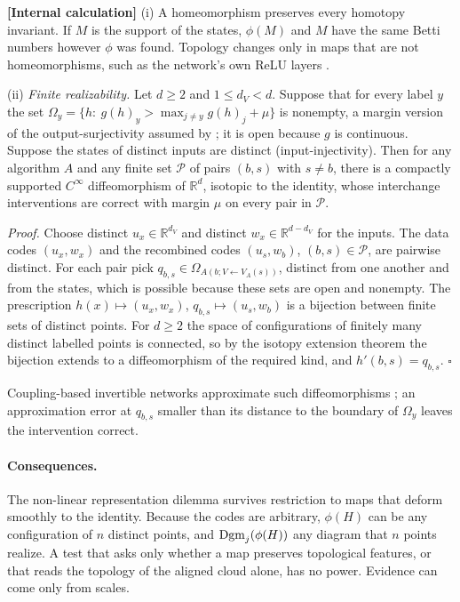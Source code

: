 \documentclass[11pt,a4paper]{article}
\newcommand{\evl}[2]{{\small\bfseries\color{#1}[#2]}}
\newcommand{\LCalc}{\evl{ccalc}{Internal calculation}}
\begin{document}
\LCalc{} (i) A homeomorphism preserves every homotopy invariant. If $M$ is the
support of the states, $\phi(M)$ and $M$ have the same Betti numbers however
$\phi$ was found. Topology changes only in maps that are not homeomorphisms,
such as the network's own ReLU layers \cite{naitzat2020}.

(ii) \emph{Finite realizability.} Let $d\ge2$ and $1\le d_V<d$. Suppose that
for every label $y$ the set
$\Omega_y=\{h:\ g(h)_y>\max_{j\neq y}g(h)_j+\mu\}$ is nonempty, a margin
version of the output-surjectivity assumed by \cite{sutter2025}; it is open
because $g$ is continuous. Suppose the states of distinct inputs are distinct
(input-injectivity). Then for any algorithm $A$ and any finite set
$\mathcal P$ of pairs $(b,s)$ with $s\neq b$, there is a compactly supported
$C^\infty$ diffeomorphism of $\mathbb R^d$, isotopic to the identity, whose
interchange interventions are correct with margin $\mu$ on every pair in
$\mathcal P$.

\emph{Proof.} Choose distinct $u_x\in\mathbb R^{d_V}$ and distinct
$w_x\in\mathbb R^{d-d_V}$ for the inputs. The data codes $(u_x,w_x)$ and the
recombined codes $(u_s,w_b)$, $(b,s)\in\mathcal P$, are pairwise distinct. For
each pair pick $q_{b,s}\in\Omega_{A(b;V\leftarrow V_A(s))}$, distinct from one
another and from the states, which is possible because these sets are open
and nonempty. The prescription $h(x)\mapsto(u_x,w_x)$,
$q_{b,s}\mapsto(u_s,w_b)$ is a bijection between finite sets of distinct
points. For $d\ge2$ the space of configurations of finitely many distinct
labelled points is connected, so by the isotopy extension theorem
\cite{hirsch1976} the bijection extends to a diffeomorphism of the required
kind, and $h'(b,s)=q_{b,s}$. $\square$

Coupling-based invertible networks approximate such diffeomorphisms
\cite{teshima2020}; an approximation error at $q_{b,s}$ smaller than its
distance to the boundary of $\Omega_y$ leaves the intervention correct.

\paragraph{Consequences.} The non-linear representation dilemma survives
restriction to maps that deform smoothly to the identity. Because the codes
are arbitrary, $\phi(H)$ can be any configuration of $n$ distinct points, and
$\operatorname{Dgm}_j(\phi(H))$ any diagram that $n$ points realize. A test that asks only
whether a map preserves topological features, or that reads the topology of
the aligned cloud alone, has no power. Evidence can come only from scales.
\end{document}
